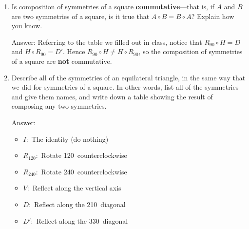 \documentclass[11pt,twoside]{article}
\begin{document}
\begin{enumerate}
\vspace{0.5cm}

\item Is composition of symmetries of a square {\bf commutative}---that is, if $A$ and $B$ are two symmetries of a square, is it true that $A \circ B = B \circ A$?  Explain how you know.

{\color{red}Answer:}
Referring to the table we filled out in class, notice that $R_{90} \circ H = D$ and $H \circ R_{90} = D'$.  Hence $R_{90} \circ H \neq H \circ R_{90}$, so the composition of symmetries of a square are {\bf not} commutative.

\vspace{0.5cm}

\item Describe all of the symmetries of an equilateral triangle, in the same way that we did for symmetries of a square.  In other words, list all of the symmetries and give them names, and write down a table showing the result of composing any two symmetries.

{\color{red}Answer:}
\begin{itemize}
\item $I \colon$ The identity (do nothing)
\item $R_{120} \colon$ Rotate 120\degree\ counterclockwise
\item $R_{240} \colon$ Rotate 240\degree\ counterclockwise
\item $V \colon$ Reflect along the vertical axis
\item $D \colon$ Reflect along the 210\degree\ diagonal
\item $D' \colon$ Reflect along the 330\degree\ diagonal
\end{itemize}

\end{enumerate}
\end{document}
